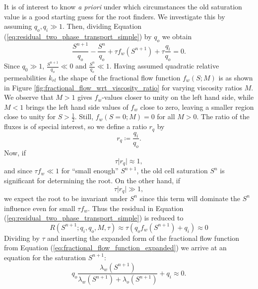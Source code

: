 It is of interest to know \emph{a priori} under which circumstances the old saturation value is a good starting guess for the root finders. We investigate this by assuming $q_o, q_i \gg 1$. Then, dividing Equation (\ref{eq:residual_two_phase_transport_simple}) by $q_o$ we obtain
\begin{equation*}
\frac{S^{n+1}}{q_o} - \frac{S^n}{q_o} + \tau f_w(S^{n+1}) + \tau \frac{q_i}{q_o} = 0.
\end{equation*}
Since $q_0 \gg 1$, $\frac{S^{n+1}}{q_o} \ll 0$ and $\frac{S^n}{q_o} \ll 1$. Having assumed quadratic relative permeabilities $k_{rl}$ the shape of the fractional flow function $f_w(S;M)$ is as shown in Figure \ref{fig:fractional_flow_wrt_viscosity_ratio} for varying viscosity ratios $M$. 
%
We observe that $M > 1$  gives $f_w$-values closer to unity on the left hand side, while $M < 1$ brings the left hand side values of $f_w$ close to zero, leaving a smaller region close to unity for $S > \frac{1}{2}$. Still, $f_w(S = 0;M) = 0$ for all $M > 0$.
The ratio of the fluxes is of special interest, so we define a ratio $r_q$ by
\begin{equation*}
r_q \coloneqq \frac{q_i}{q_o}.
\end{equation*} 
Now, if 
\begin{equation*}
 \tau \lvert r_q \rvert \approx  1,
\end{equation*} 
and since $\tau f_w \ll 1$ for ``small enough'' $S^{n+1}$, the old cell saturation $S^n$ is significant for determining the root. On the other hand, if 
\begin{equation} \label{eq:flux_term_dominance_criterium}
 \tau \lvert r_q \rvert \gg 1,
\end{equation}
we expect the root to be invariant under $S^n$ since this term will dominate the $S^n$ influence even for small $\tau f_w$. Thus the residual in Equation (\ref{eq:residual_two_phase_transport_simple}) is reduced to
\begin{equation*}
R(S^{n+1};q_i,q_o,M,\tau) \approx \tau \left(q_o f_w(S^{n+1}) + q_i\right) \approx 0
\end{equation*}
Dividing by $\tau$ and inserting the expanded form of the fractional flow function from Equation (\ref{eq:fractional_flow_function_expanded}) we arrive at an equation for the saturation $S^{n+1}$:
\begin{equation*}
 q_o \frac{\lambda_w(S^{n+1})}{\lambda_w(S^{n+1}) + \lambda_o(S^{n+1})} + q_i \approx 0.
\end{equation*}
